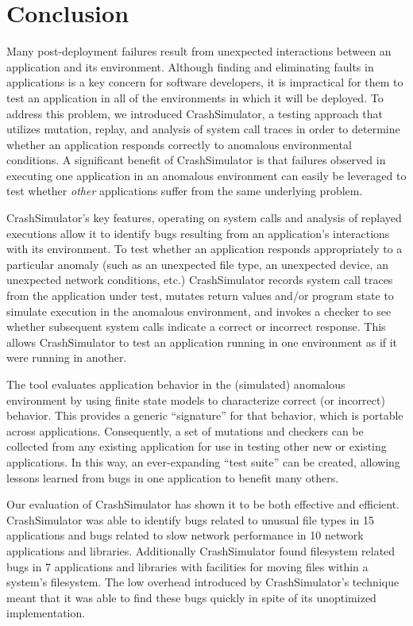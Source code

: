 \section{Conclusion} \label{sec:conclusion}
Many post-deployment failures result from
unexpected interactions between an application and its environment.
Although finding and eliminating faults in applications is a key concern for software developers, it is impractical for them to test an application in all of the
environments in which it will be deployed.
 To address this
problem, we introduced CrashSimulator, a testing
approach that utilizes mutation, replay, and analysis of system call traces
in order to determine whether an application responds correctly to
anomalous environmental conditions.
A significant benefit of CrashSimulator is that failures observed
in executing one application in an anomalous environment can
easily be leveraged to test whether {\em other} applications
suffer from the same underlying problem.

CrashSimulator's key features, operating on system calls and analysis of replayed executions allow it to identify bugs
resulting from an application's interactions with its environment.
To test whether an application responds appropriately to a particular
anomaly (such as an unexpected file type, an unexpected device, an unexpected
network conditions, etc.)
CrashSimulator records system call traces from the application under test,
mutates return values and/or program state to simulate execution in 
the anomalous environment, and invokes a checker to see whether
subsequent system calls indicate a correct or incorrect response.
This allows
CrashSimulator to test an application running in one environment
as if it were running in another.

The tool evaluates application behavior in the (simulated) anomalous environment
by using
finite state models to characterize correct (or incorrect) behavior.
This provides a generic ``signature'' for that behavior, which is
portable across applications. 
Consequently, a set of mutations and checkers can be collected from any existing
application for use in testing other new or existing applications. 
In this way, an ever-expanding ``test suite'' can
be created, allowing lessons learned from bugs in one application to benefit many
others.

Our evaluation of CrashSimulator has shown it to be both effective and
efficient.  CrashSimulator was able to identify bugs related to unusual file
types in 15 applications and bugs related to slow network performance in 10
network applications and libraries.  Additionally CrashSimulator found
filesystem related bugs in 7 applications and libraries with facilities for
moving files within a system's filesystem.  The low overhead
introduced by CrashSimulator's technique meant that it was able to
find these bugs quickly in spite of its unoptimized implementation.

